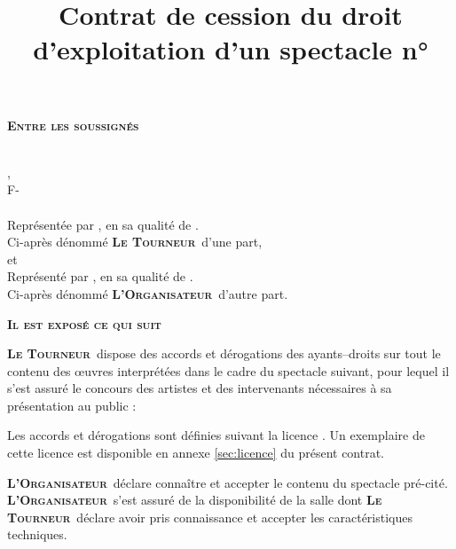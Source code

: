 \documentclass[a4paper,10pt]{article}
\title{Contrat de cession du droit d'exploitation d'un spectacle n°\NUMBERCONTRAT{}}
\author{\AMMDlong}
\newcommand{\PR}{\textbf{\textsc{Le Tourneur}}}
\newcommand{\OR}{\textbf{\textsc{L'Organisateur}}}
\begin{document}
\maketitle
\thispagestyle{fancy}

{
  \noindent\large\textbf{\textsc{Entre les soussign\'es}}
\vspace{0.3cm}
}

\noindent\emph{{\large \AMMDlong{}}}\\
\ADRAMMD{},\\
F-\CPAMMD{} \VILLEAMMD{}\\
\SIRETAMMD{}\newline
\emph{\TELAMMD{}}\\
Repr\'esent\'ee par \emph{\REPRESENTANTAMMD}, en sa qualit\'e de \emph{\QUALITEREPRESENTANT{}}.\\
Ci-apr\`es d\'enomm\'e \PR\ d'une part,\\

et\\

\noindent\emph{\large \RAISONSOCIALE{}}\newline
\ADRESSE{}\newline
\emph{\TELEPHONE{}}\newline
\SIRET{}\newline
\ENTREPRENEUR{}
\hfill \CAT{}\newline
\noindent Repr\'esent\'e par \emph{\REPRESENTANT{}}, en sa qualit\'e de \emph{\QUALITE{}}.\\
Ci-apr\`es d\'enomm\'e \OR\ d'autre part.\\
\vspace{.5cm}
\begin{center}
  \large
  \textbf{\textsc{Il est expos\'e ce qui suit}}
\end{center}

\PR\ dispose des accords et d\'erogations des ayants--droits
\emph{\PAYS{}} sur tout le contenu des \oe uvres interpr\'et\'ees dans
le cadre du spectacle suivant, pour lequel il s'est assur\'e le concours
des artistes et des intervenants n\'ecessaires \`a sa pr\'esentation au public :
\begin{center}
  \textbf{\textsc{\NOMSPECTACLE{}}}
\end{center}
Les accords et d\'erogations sont d\'efinies suivant la licence
\emph{\LICENCETYPE{}}. Un exemplaire de cette licence est disponible en
annexe \ref{sec:licence} du pr\'esent contrat.

\OR\ d\'eclare conna\^itre et accepter le contenu du spectacle pr\'e-cit\'e.
\OR\ s'est assur\'e de la disponibilit\'e de la salle
\emph{\NOMADRSALLE{}} dont \PR\ d\'eclare avoir pris connaissance et
accepter les caract\'eristiques techniques.
\end{document}
